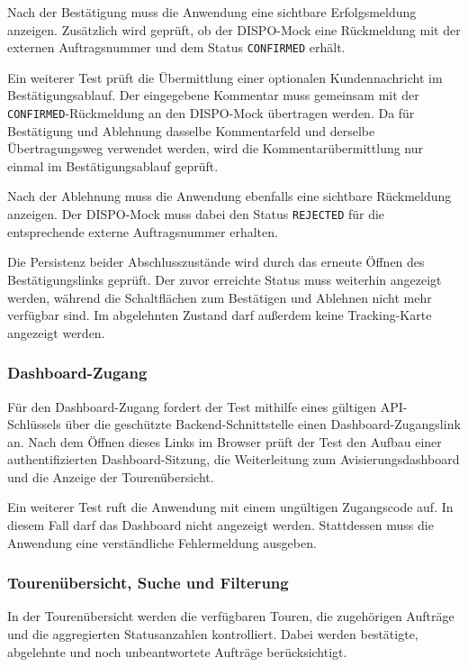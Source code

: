Nach der Bestätigung muss die Anwendung eine sichtbare
Erfolgsmeldung anzeigen. Zusätzlich wird geprüft, ob der
DISPO-Mock eine Rückmeldung mit der externen Auftragsnummer und
dem Status \texttt{CONFIRMED} erhält.

Ein weiterer Test prüft die Übermittlung einer optionalen
Kundennachricht im Bestätigungsablauf. Der eingegebene Kommentar
muss gemeinsam mit der \texttt{CONFIRMED}-Rückmeldung an den
DISPO-Mock übertragen werden. Da für Bestätigung und Ablehnung
dasselbe Kommentarfeld und derselbe Übertragungsweg verwendet
werden, wird die Kommentarübermittlung nur einmal im
Bestätigungsablauf geprüft.

Nach der Ablehnung muss die Anwendung ebenfalls eine sichtbare
Rückmeldung anzeigen. Der DISPO-Mock muss dabei den Status
\texttt{REJECTED} für die entsprechende externe Auftragsnummer
erhalten.

Die Persistenz beider Abschlusszustände wird durch das erneute
Öffnen des Bestätigungslinks geprüft. Der zuvor erreichte Status
muss weiterhin angezeigt werden, während die Schaltflächen zum
Bestätigen und Ablehnen nicht mehr verfügbar sind. Im
abgelehnten Zustand darf außerdem keine Tracking-Karte
angezeigt werden.

\subsubsection{Dashboard-Zugang}

Für den Dashboard-Zugang fordert der Test mithilfe eines gültigen
API-Schlüssels über die geschützte Backend-Schnittstelle einen
Dashboard-Zugangslink an. Nach dem Öffnen dieses Links im Browser
prüft der Test den Aufbau einer authentifizierten
Dashboard-Sitzung, die Weiterleitung zum Avisierungsdashboard
und die Anzeige der Tourenübersicht.

Ein weiterer Test ruft die Anwendung mit einem ungültigen
Zugangscode auf. In diesem Fall darf das Dashboard nicht
angezeigt werden. Stattdessen muss die Anwendung eine
verständliche Fehlermeldung ausgeben.

\subsubsection{Tourenübersicht, Suche und Filterung}

In der Tourenübersicht werden die verfügbaren Touren, die
zugehörigen Aufträge und die aggregierten Statusanzahlen
kontrolliert. Dabei werden bestätigte, abgelehnte und noch
unbeantwortete Aufträge berücksichtigt.

